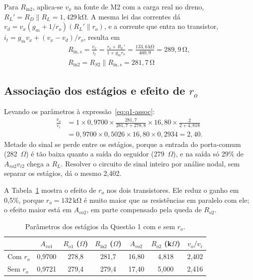\documentclass[12pt,a4paper]{report}
\newcommand{\un}[1]{\,\mathrm{#1}}
\newcommand{\kohm}{\un{k\Omega}}
\newcommand{\Om}{\un{\Omega}}
\begin{document}
Para $R_{\mathrm{in}2}$, aplica-se $v_x$ na fonte de M2 com a carga real no dreno, $R_L' = R_D\parallel R_L = 1{,}429\kohm$. A mesma lei das correntes dá $v_d = v_x(g_m + 1/r_o)(R_L'\parallel r_o)$, e a corrente que entra no transistor, $i_t = g_mv_x + (v_x - v_d)/r_o$, resulta em
\begin{gather*}
R_{\mathrm{in},s} = \frac{v_x}{i_t} = \frac{r_o + R_L'}{1 + g_mr_o} = \frac{133{,}6\kohm}{460{,}9} = 289{,}9\Om,\\[6pt]
\boxed{R_{\mathrm{in}2} = R_{S2}\parallel R_{\mathrm{in},s} = 281{,}7\Om}
\end{gather*}

\subsection{Associação dos estágios e efeito de \texorpdfstring{$r_o$}{ro}}

Levando os parâmetros à expressão~\eqref{eq:q1-assoc}:
\begin{align*}
\frac{v_o}{v_i} &= 1\times0{,}9700\times\frac{281{,}7}{281{,}7+278{,}8}\times16{,}80\times\frac{2}{2+4{,}818}\\[4pt]
&= 0{,}9700\times0{,}5026\times16{,}80\times0{,}2934 = 2{,}40.
\end{align*}
Metade do sinal se perde entre os estágios, porque a entrada do porta-comum (282~$\Omega$) é tão baixa quanto a saída do seguidor (279~$\Omega$), e na saída só 29\% de $A_{vo2}v_{i2}$ chega a $R_L$. Resolver o circuito de sinal inteiro por análise nodal, sem separar os estágios, dá o mesmo 2,402.

A Tabela~\ref{tab:q1-ro} mostra o efeito de $r_o$ nos dois transistores. Ele reduz o ganho em 0,5\%, porque $r_o = 132\kohm$ é muito maior que as resistências em paralelo com ele; o efeito maior está em $A_{vo2}$, em parte compensado pela queda de $R_{o2}$.

\begin{table}[H]
\centering
\caption{Parâmetros dos estágios da Questão 1 com e sem $r_o$.}
\label{tab:q1-ro}
\begin{tabular}{lcccccc}
\toprule
 & $A_{vo1}$ & $R_{o1}$ ($\Omega$) & $R_{\mathrm{in}2}$ ($\Omega$) & $A_{vo2}$ & $R_{o2}$ (k$\Omega$) & $v_o/v_i$ \\
\midrule
Com $r_o$ & 0,9700 & 278,8 & 281,7 & 16,80 & 4,818 & 2,402 \\
Sem $r_o$ & 0,9721 & 279,4 & 279,4 & 17,40 & 5,000 & 2,416 \\
\bottomrule
\end{tabular}
\end{table}
\end{document}

